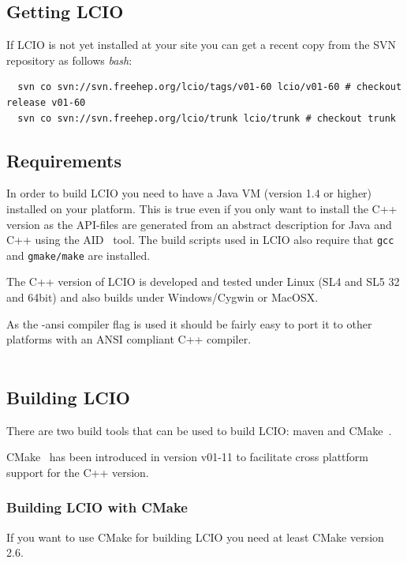 \documentclass[twoside]{article}
\begin{document}
\subsection{Getting LCIO}
If LCIO is not yet installed at your site you can get a recent copy from the SVN repository as
follows {\it bash}:

\begin{verbatim}
  svn co svn://svn.freehep.org/lcio/tags/v01-60 lcio/v01-60 # checkout release v01-60
  svn co svn://svn.freehep.org/lcio/trunk lcio/trunk # checkout trunk
\end{verbatim}

\subsection{Requirements}
In order to build LCIO you need to have a Java VM (version 1.4 or higher) installed 
on your platform. This is true even if you only want to install the C++ version as the 
API-files are generated from an abstract description for Java and C++ using the 
AID~\cite{ref_aid} tool. The build scripts used in LCIO also require that \verb$gcc$ and 
\verb$gmake/make$ are installed.

The C++ version of LCIO is developed and tested under Linux (SL4 and SL5 32 and 64bit)
and also builds under Windows/Cygwin or MacOSX.

As the -ansi compiler flag is used it should be fairly easy to port it to other platforms with
an ANSI compliant C++ compiler.\\\\

\subsection{Building LCIO} \label{build_lcio}

There are two build tools that can be used to build LCIO: maven and CMake~\cite{ref_cmake}. 

CMake~\cite{ref_cmake} has been introduced in version v01-11 to facilitate cross plattform support for 
the C++ version. 

\subsubsection{Building LCIO with CMake}
If you want to use CMake for building LCIO you need at least CMake version 2.6.

\end{document}
